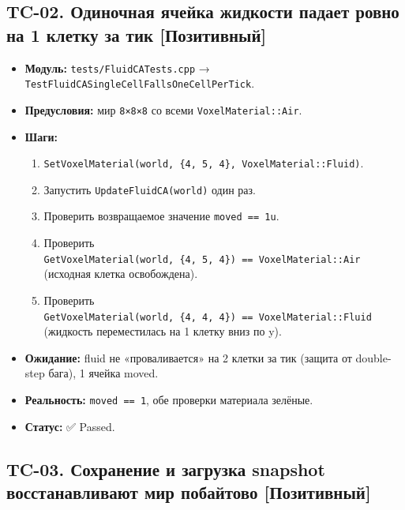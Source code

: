\documentclass[
  11pt,a4paper,oneside]{article}
\providecommand{\tightlist}{%
  \setlength{\itemsep}{0pt}\setlength{\parskip}{0pt}}
\providecommand{\tightlist}{%
  \setlength{\itemsep}{0pt}\setlength{\parskip}{0pt}}
\begin{document}
\subsection{TC-02. Одиночная ячейка жидкости падает ровно на 1 клетку за тик {[}Позитивный{]}}\label{tc-02-ux43eux434ux438ux43dux43eux447ux43dux430ux44f-ux44fux447ux435ux439ux43aux430-ux436ux438ux434ux43aux43eux441ux442ux438-ux43fux430ux434ux430ux435ux442-ux440ux43eux432ux43dux43e-ux43dux430-1-ux43aux43bux435ux442ux43aux443-ux437ux430-ux442ux438ux43a-ux43fux43eux437ux438ux442ux438ux432ux43dux44bux439}

\begin{itemize}
\tightlist
\item
  \textbf{Модуль:} \texttt{tests/FluidCATests.cpp} → \texttt{TestFluidCASingleCellFallsOneCellPerTick}.
\item
  \textbf{Предусловия:} мир \texttt{8×8×8} со всеми \texttt{VoxelMaterial::Air}.
\item
  \textbf{Шаги:}

  \begin{enumerate}
  \def\labelenumi{\arabic{enumi}.}
  \tightlist
  \item
    \texttt{SetVoxelMaterial(world,\ \{4,\ 5,\ 4\},\ VoxelMaterial::Fluid)}.
  \item
    Запустить \texttt{UpdateFluidCA(world)} один раз.
  \item
    Проверить возвращаемое значение \texttt{moved\ ==\ 1u}.
  \item
    Проверить \texttt{GetVoxelMaterial(world,\ \{4,\ 5,\ 4\})\ ==\ VoxelMaterial::Air} (исходная клетка освобождена).
  \item
    Проверить \texttt{GetVoxelMaterial(world,\ \{4,\ 4,\ 4\})\ ==\ VoxelMaterial::Fluid} (жидкость переместилась на 1 клетку вниз по y).
  \end{enumerate}
\item
  \textbf{Ожидание:} fluid не «проваливается» на 2 клетки за тик (защита от double-step бага), 1 ячейка moved.
\item
  \textbf{Реальность:} \texttt{moved\ ==\ 1}, обе проверки материала зелёные.
\item
  \textbf{Статус:} ✅ Passed.
\end{itemize}

\subsection{TC-03. Сохранение и загрузка snapshot восстанавливают мир побайтово {[}Позитивный{]}}\label{tc-03-ux441ux43eux445ux440ux430ux43dux435ux43dux438ux435-ux438-ux437ux430ux433ux440ux443ux437ux43aux430-snapshot-ux432ux43eux441ux441ux442ux430ux43dux430ux432ux43bux438ux432ux430ux44eux442-ux43cux438ux440-ux43fux43eux431ux430ux439ux442ux43eux432ux43e-ux43fux43eux437ux438ux442ux438ux432ux43dux44bux439}
\end{document}
